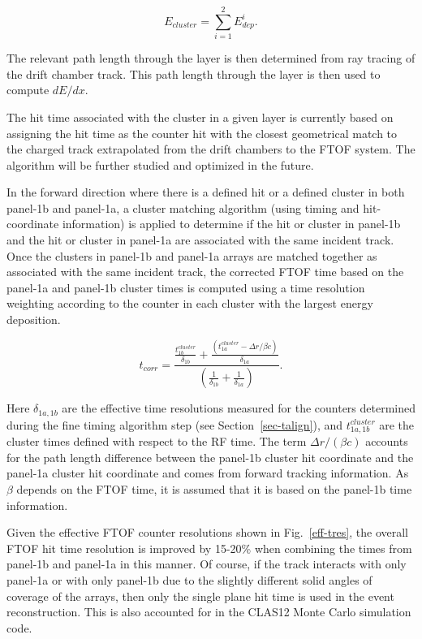 \documentclass{elsart}
\begin{document}
\begin{equation}
  E_{cluster} = \sum_{i=1}^{2} E_{dep}^i.
\end{equation}

\noindent
The relevant path length through the layer is then determined from ray tracing of the drift chamber
track. This path length through the layer is then used to compute $dE/dx$.

The hit time associated with the cluster in a given layer is currently based on assigning the hit time as
the counter hit with the closest geometrical match to the charged track extrapolated from the drift
chambers to the FTOF system. The algorithm will be further studied and optimized in the future.

In the forward direction where there is a defined hit or a defined cluster in both panel-1b and panel-1a,
a cluster matching algorithm (using timing and hit-coordinate information) is applied to determine if the
hit or cluster in panel-1b and the hit or cluster in panel-1a are associated with the same incident track.
Once the clusters in panel-1b and panel-1a arrays are matched together as associated with the same
incident track, the corrected FTOF time based on the panel-1a and panel-1b cluster times is computed using
a time resolution weighting according to the counter in each cluster with the largest energy deposition.

\begin{equation}
  t_{corr} = \frac{\displaystyle \frac{\displaystyle t_{1b}^{cluster}}{\displaystyle \delta_{1b}} +
    \frac{\displaystyle (t_{1a}^{cluster} - \Delta r/\beta c)}{\displaystyle \delta_{1a}}}
  {\displaystyle \left( \frac{\displaystyle 1}{\displaystyle \delta_{1b}} +
    \frac{\displaystyle 1}{\displaystyle \delta_{1a}} \right)}.
\end{equation}

\noindent
Here $\delta_{1a,1b}$ are the effective time resolutions measured for the counters determined during
the fine timing algorithm step (see Section~\ref{sec-talign}), and $t_{1a,1b}^{cluster}$ are the cluster
times defined with respect to the RF time. The term $\Delta r/(\beta c)$ accounts for the path length
difference between the panel-1b cluster hit coordinate and the panel-1a cluster hit coordinate and comes
from forward tracking information. As $\beta$ depends on the FTOF time, it is assumed that it is based
on the panel-1b time information.

Given the effective FTOF counter resolutions shown in Fig.~\ref{eff-tres}, the overall FTOF hit
time resolution is improved by 15-20\% when combining the times from panel-1b and panel-1a in this
manner. Of course, if the track interacts with only panel-1a or with only panel-1b due to the slightly
different solid angles of coverage of the arrays, then only the single plane hit time is used in the
event reconstruction. This is also accounted for in the CLAS12 Monte Carlo simulation code.
  
\end{document}
